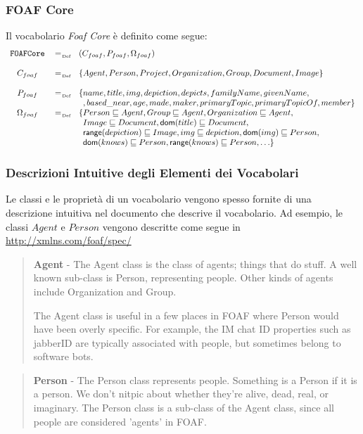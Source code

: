 \documentclass[8pt]{beamer}
\begin{document}
\newcommand{\foafcore}{\mathtt{FOAFCore}}
\begin{frame}
\frametitle{FOAF Core}
Il vocabolario \emph{Foaf Core} \`e definito come segue:
\[
 \begin{array}{ccl}
 \foafcore & \defAs & (C_{foaf}, P_{foaf}, \Omega_{foaf}) \\
 &&\\
 C_{foaf} & \defAs & \{Agent, Person, Project, Organization, Group, Document, Image\}\\
 &&\\
 P_{foaf} & \defAs & \{name, title, img, depiction, depicts, familyName, givenName,\\
 && \phantom{\}}, based\_near, age, made, maker, primaryTopic, primaryTopicOf, member \}\\
 \Omega_{foaf} & \defAs & \{ Person \Issub Agent, Group \Issub Agent, Organization \Issub Agent, \\
 && \phantom{\{} Image \Issub Document, \dom(title) \Issub Document, \\
 && \phantom{\{}\range(depiction) \Issub Image, img \Issub depiction, \dom(img) \Issub Person,\\
 && \phantom{\{}\dom(knows) \Issub Person, \range(knows) \Issub Person, \ldots \}\\
 \end{array}
\]
\end{frame}

\begin{frame}
\frametitle{Descrizioni Intuitive degli Elementi dei Vocabolari}
Le classi e le propriet\`a di un vocabolario vengono spesso fornite
di una descrizione intuitiva nel documento che descrive il vocabolario.
Ad esempio, le classi $Agent$ e $Person$ vengono descritte come segue 
in \url{http://xmlns.com/foaf/spec/}
\begin{quote}
\textbf{Agent} - The Agent class is the class of agents; things that do stuff. A well known 
sub-class is Person, representing people. Other kinds of agents include 
Organization and Group.

The Agent class is useful in a few places in FOAF where Person would have 
been overly specific. For example, the IM chat ID properties such as 
jabberID are typically associated with people, but sometimes belong to 
software bots.  
\end{quote}

\begin{quote}
\textbf{Person} - The Person class represents people. Something is a Person if it is a person.
We don't nitpic about whether they're alive, dead, real, or imaginary. 
The Person class is a sub-class of the Agent class, since all people are 
considered 'agents' in FOAF.  
\end{quote}
\end{frame}
\end{document}
